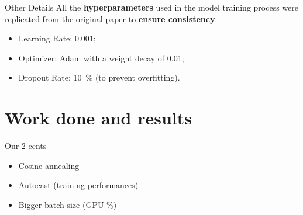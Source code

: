 	\begin{frame}{Other Details}
		All the \textbf{hyperparameters} used in the model training process were replicated from the original paper to \textbf{ensure consistency}:
		
		\begin{itemize}
			\item Learning Rate: \SI{0.001}{};
			\item Optimizer: Adam with a weight decay of \SI{0.01}{};
			\item Dropout Rate: \SI{10}{\percent} (to prevent overfitting).

		
		\end{itemize}
		
		\note{
			\dots
		}
	\end{frame}

\section[Work done and results]{Work done and results}	

\begin{frame}{Our 2 cents}

	\begin{itemize}
	\item Cosine annealing
	\item Autocast (training performances)
	\item Bigger batch size (GPU \%)
	\end{itemize}

\end{frame}

